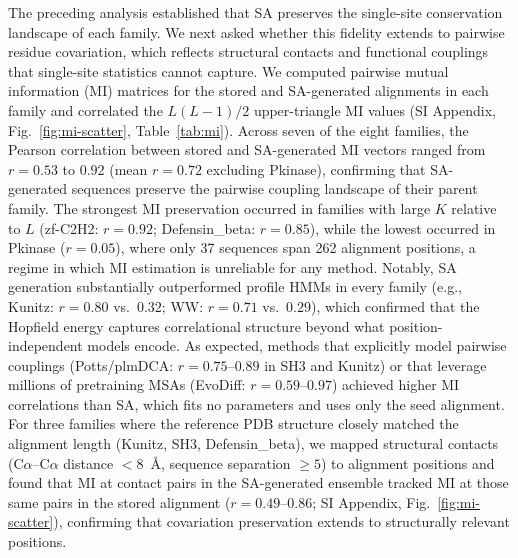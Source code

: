 The preceding analysis established that SA preserves the single-site conservation landscape of each family. We next asked whether this fidelity extends to pairwise residue covariation, which reflects structural contacts and functional couplings that single-site statistics cannot capture. We computed pairwise mutual information (MI) matrices for the stored and SA-generated alignments in each family and correlated the $L(L{-}1)/2$ upper-triangle MI values (SI Appendix, Fig.~\ref{fig:mi-scatter}, Table~\ref{tab:mi}). Across seven of the eight families, the Pearson correlation between stored and SA-generated MI vectors ranged from $r{=}0.53$ to $0.92$ (mean $r{=}0.72$ excluding Pkinase), confirming that SA-generated sequences preserve the pairwise coupling landscape of their parent family. The strongest MI preservation occurred in families with large $K$ relative to $L$ (zf-C2H2: $r{=}0.92$; Defensin\_beta: $r{=}0.85$), while the lowest occurred in Pkinase ($r{=}0.05$), where only 37 sequences span 262 alignment positions, a regime in which MI estimation is unreliable for any method. Notably, SA generation substantially outperformed profile HMMs in every family (e.g., Kunitz: $r{=}0.80$ vs.\ $0.32$; WW: $r{=}0.71$ vs.\ $0.29$), which confirmed that the Hopfield energy captures correlational structure beyond what position-independent models encode. As expected, methods that explicitly model pairwise couplings (Potts/plmDCA: $r{=}0.75$--$0.89$ in SH3 and Kunitz) or that leverage millions of pretraining MSAs (EvoDiff: $r{=}0.59$--$0.97$) achieved higher MI correlations than SA, which fits no parameters and uses only the seed alignment. For three families where the reference PDB structure closely matched the alignment length (Kunitz, SH3, Defensin\_beta), we mapped structural contacts (C$\alpha$--C$\alpha$ distance ${<}8$~\AA, sequence separation ${\geq}5$) to alignment positions and found that MI at contact pairs in the SA-generated ensemble tracked MI at those same pairs in the stored alignment ($r{=}0.49$--$0.86$; SI Appendix, Fig.~\ref{fig:mi-scatter}), confirming that covariation preservation extends to structurally relevant positions.

